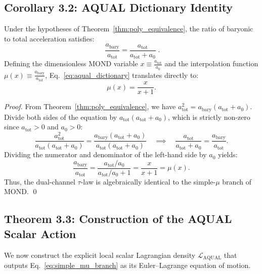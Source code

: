 \documentclass[11pt,a4paper]{article}
\theoremstyle{definition}
\begin{document}
\subsection{Corollary 3.2: AQUAL Dictionary Identity}
\begin{corollary}
\label{cor:aqual_dictionary}
Under the hypotheses of Theorem~\ref{thm:poly_equivalence}, the ratio of baryonic to total acceleration satisfies:
\begin{equation}
\boxed{\;\frac{a_{\text{bary}}}{a_{\text{tot}}} = \frac{a_{\text{tot}}}{a_{\text{tot}} + a_0}\;}.
\label{eq:aqual_dictionary}
\end{equation}
Defining the dimensionless MOND variable $x \equiv \frac{a_{\text{tot}}}{a_0}$ and the interpolation function $\mu(x) \equiv \frac{a_{\text{bary}}}{a_{\text{tot}}}$, Eq.~\eqref{eq:aqual_dictionary} translates directly to:
\begin{equation}
\mu(x) = \frac{x}{x+1}.
\label{eq:simple_mu_branch}
\end{equation}
\end{corollary}

\begin{proof}
From Theorem~\ref{thm:poly_equivalence}, we have $a_{\text{tot}}^2 = a_{\text{bary}}(a_{\text{tot}} + a_0)$. Divide both sides of the equation by $a_{\text{tot}}(a_{\text{tot}} + a_0)$, which is strictly non-zero since $a_{\text{tot}} > 0$ and $a_0 > 0$:
\begin{equation}
\frac{a_{\text{tot}}^2}{a_{\text{tot}}(a_{\text{tot}} + a_0)} = \frac{a_{\text{bary}}(a_{\text{tot}} + a_0)}{a_{\text{tot}}(a_{\text{tot}} + a_0)} \quad \implies \quad \frac{a_{\text{tot}}}{a_{\text{tot}} + a_0} = \frac{a_{\text{bary}}}{a_{\text{tot}}}.
\end{equation}
Dividing the numerator and denominator of the left-hand side by $a_0$ yields:
\begin{equation}
\frac{a_{\text{bary}}}{a_{\text{tot}}} = \frac{a_{\text{tot}}/a_0}{a_{\text{tot}}/a_0 + 1} = \frac{x}{x+1} = \mu(x).
\end{equation}
Thus, the dual-channel $\tau$-law is algebraically identical to the simple-$\mu$ branch of MOND. \qed
\end{proof}

\subsection{Theorem 3.3: Construction of the AQUAL Scalar Action}
We now construct the explicit local scalar Lagrangian density $\mathcal{L}_{\text{AQUAL}}$ that outputs Eq.~\eqref{eq:simple_mu_branch} as its Euler--Lagrange equation of motion.
\end{document}
